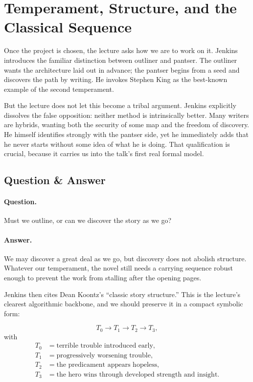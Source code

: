 \section{Temperament, Structure, and the Classical Sequence}

Once the project is chosen, the lecture asks how we are to work on it. Jenkins introduces the familiar distinction between outliner and pantser. The outliner wants the architecture laid out in advance; the pantser begins from a seed and discovers the path by writing. He invokes Stephen King as the best-known example of the second temperament.

But the lecture does not let this become a tribal argument. Jenkins explicitly dissolves the false opposition: neither method is intrinsically better. Many writers are hybrids, wanting both the security of some map and the freedom of discovery. He himself identifies strongly with the pantser side, yet he immediately adds that he never starts without some idea of what he is doing. That qualification is crucial, because it carries us into the talk's first real formal model.

\subsection{Question \& Answer}

\paragraph{Question.} Must we outline, or can we discover the story as we go?

\paragraph{Answer.} We may discover a great deal as we go, but discovery does not abolish structure. Whatever our temperament, the novel still needs a carrying sequence robust enough to prevent the work from stalling after the opening pages.

Jenkins then cites Dean Koontz's ``classic story structure.'' This is the lecture's clearest algorithmic backbone, and we should preserve it in a compact symbolic form:

\begin{equation}
T_0 \to T_1 \to T_2 \to T_3,
\end{equation}
with
\begin{align}
T_0&=\text{terrible trouble introduced early},\\
T_1&=\text{progressively worsening trouble},\\
T_2&=\text{the predicament appears hopeless},\\
T_3&=\text{the hero wins through developed strength and insight}.
\end{align}

